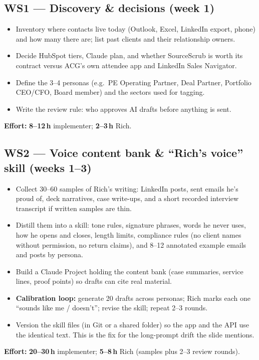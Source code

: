 \documentclass[11pt]{article}
\newcommand{\hrs}[1]{\textbf{#1\,h}}
\begin{document}
\subsection{WS1 --- Discovery \& decisions (week 1)}
\begin{itemize}
  \item Inventory where contacts live today (Outlook, Excel, LinkedIn export, phone) and how many
  there are; list past clients and their relationship owners.
  \item Decide HubSpot tiers, Claude plan, and whether SourceScrub is worth its contract versus
  ACG's own attendee app and LinkedIn Sales Navigator.
  \item Define the 3--4 personas (e.g.\ PE Operating Partner, Deal Partner, Portfolio CEO/CFO,
  Board member) and the sectors used for tagging.
  \item Write the review rule: who approves AI drafts before anything is sent.
\end{itemize}
\textbf{Effort:} \hrs{8--12} implementer; \hrs{2--3} Rich.

\subsection{WS2 --- Voice content bank \& ``Rich's voice'' skill (weeks 1--3)}
\begin{itemize}
  \item Collect 30--60 samples of Rich's writing: LinkedIn posts, sent emails he's proud of,
  deck narratives, case write-ups, and a short recorded interview transcript if written
  samples are thin.
  \item Distill them into a skill: tone rules, signature phrases, words he never uses, how he
  opens and closes, length limits, compliance rules (no client names without permission, no
  return claims), and 8--12 annotated example emails and posts by persona.
  \item Build a Claude Project holding the content bank (case summaries, service lines,
  proof points) so drafts can cite real material.
  \item \textbf{Calibration loop:} generate 20 drafts across personas; Rich marks each one ``sounds
  like me / doesn't''; revise the skill; repeat 2--3 rounds.
  \item Version the skill files (in Git or a shared folder) so the app and the API use the
  identical text. This is the fix for the long-prompt drift the slide mentions.
\end{itemize}
\textbf{Effort:} \hrs{20--30} implementer; \hrs{5--8} Rich (samples plus 2--3 review rounds).
\end{document}
